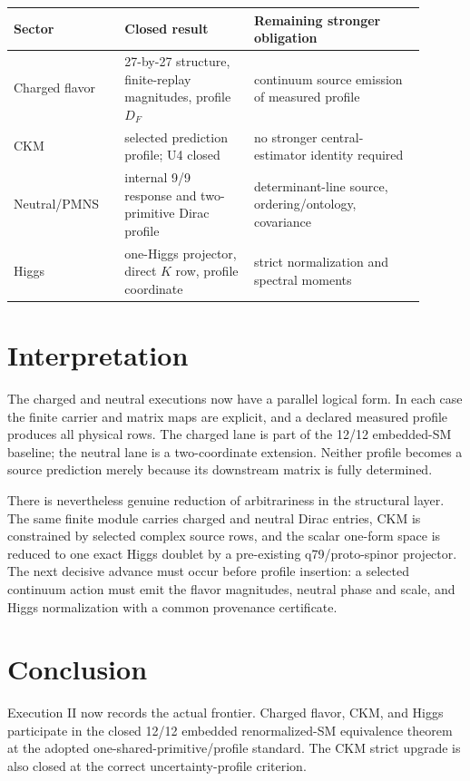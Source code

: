 \documentclass[11pt]{article}
\begin{document}
\begin{center}
\begin{tabular}{p{0.24\linewidth}p{0.29\linewidth}p{0.37\linewidth}}
\toprule
Sector & Closed result & Remaining stronger obligation \\
\midrule
Charged flavor & 27-by-27 structure, finite-replay magnitudes, profile
$D_F$ & continuum source emission of measured profile \\
CKM & selected prediction profile; U4 closed & no stronger central-estimator
identity required \\
Neutral/PMNS & internal 9/9 response and two-primitive Dirac profile &
determinant-line source, ordering/ontology, covariance \\
Higgs & one-Higgs projector, direct $K$ row, profile coordinate & strict
normalization and spectral moments \\
\bottomrule
\end{tabular}
\end{center}

\section{Interpretation}

The charged and neutral executions now have a parallel logical form. In each
case the finite carrier and matrix maps are explicit, and a declared measured
profile produces all physical rows. The charged lane is part of the 12/12
embedded-SM baseline; the neutral lane is a two-coordinate extension. Neither
profile becomes a source prediction merely because its downstream matrix is
fully determined.

There is nevertheless genuine reduction of arbitrariness in the structural
layer. The same finite module carries charged and neutral Dirac entries, CKM
is constrained by selected complex source rows, and the scalar one-form space
is reduced to one exact Higgs doublet by a pre-existing q79/proto-spinor
projector. The next decisive advance must occur before profile insertion: a
selected continuum action must emit the flavor magnitudes, neutral phase and
scale, and Higgs normalization with a common provenance certificate.

\section{Conclusion}

Execution II now records the actual frontier. Charged flavor, CKM, and Higgs
participate in the closed 12/12 embedded renormalized-SM equivalence theorem at
the adopted one-shared-primitive/profile standard. The CKM strict upgrade is
also closed at the correct uncertainty-profile criterion.
\end{document}
